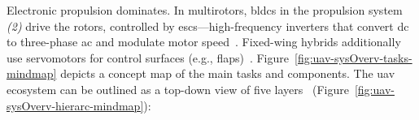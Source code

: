 Electronic propulsion dominates. In multirotors, \glspl{bldc} in the propulsion system \emph{(2)} drive the rotors, controlled by \glspl{esc}—high-frequency inverters that convert \gls{dc} to three-phase \gls{ac} and modulate motor speed~\cite{malyshev_research_2024}. 
Fixed-wing hybrids additionally use servomotors for control surfaces (e.g., flaps)~\cite{gabrielBLDCFixedWingUAV2011}.
Figure~\ref{fig:uav-sysOverv-tasks-mindmap} depicts a concept map of the main tasks and components.
%
The \gls{uav} ecosystem can be outlined as a top-down view of five layers~\cite{glossner2021overview}
(Figure~\ref{fig:uav-sysOverv-hierarc-mindmap}): 
